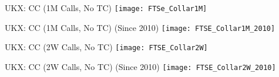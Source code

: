 \documentclass{beamer}
\begin{document}
\begin{frame}{UKX: CC (1M Calls, No TC)}
\texttt{[image: FTSe\_Collar1M]}
\end{frame}

\begin{frame}{UKX: CC (1M Calls, No TC) (Since 2010)}
\texttt{[image: FTSE\_Collar1M\_2010]}
\end{frame}

\begin{frame}{UKX: CC (2W Calls, No TC)}
\texttt{[image: FTSE\_Collar2W]}
\end{frame}

\begin{frame}{UKX: CC (2W Calls, No TC) (Since 2010)}
\texttt{[image: FTSE\_Collar2W\_2010]}
\end{frame}
\end{document}
